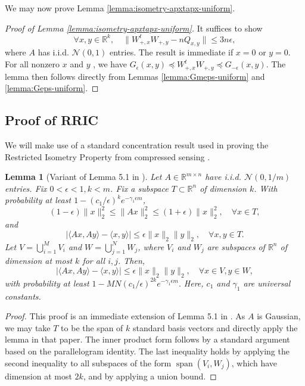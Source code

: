\documentclass[11pt]{article}
\newtheorem{lemma}[theorem]{Lemma}
\newcommand{\R}{\mathbb{R}}
\newcommand{\eps}{\epsilon}
\newcommand{\calN}{\mathcal{N}}
\newcommand{\tran}{t}
\newcommand{\Wplus}[1]{W_{+, #1}}
\newcommand{\Wpx}{\Wplus{x}}
\newcommand{\Wpy}{\Wplus{y}}
\newcommand{\WpxtWpy}{\Wpx^\tran \Wpy}
\newcommand{\Gmeps}{G_{-\eps}}
\newcommand{\Geps}{G_{\eps}}
\newcommand{\matrixleq}{\preceq}
\newcommand{\Qxy}{Q_{x,y}}
\DeclareMathOperator{\Span}{span}
\begin{document}
We may now prove Lemma \ref{lemma:isometry-apxtapx-uniform}.
\begin{proof}[Proof of Lemma \ref{lemma:isometry-apxtapx-uniform}]

It suffices to show
\[
\forall x,y \in \R^k, \quad \|\WpxtWpy -  n\Qxy \| \leq  3 n\eps,
\]
where $A$ has i.i.d. $\mathcal{N}(0,1)$ entries.
The result is immediate if $x=0$ or $y = 0$.
  For all nonzero $x$ and $y$ , we have $\Geps(x,y) \matrixleq \WpxtWpy \matrixleq \Gmeps(x,y)$.  The lemma then follows directly from Lemmas \ref{lemma:Gmeps-uniform} and \ref{lemma:Geps-uniform}.
\end{proof}


\subsection{Proof of RRIC} \label{sec:RRIC-Gaussian}


We will make use of a standard concentration result used in proving the Restricted Isometry Property from compressed sensing \cite{Baraniuk2008}.
\begin{lemma}[Variant of Lemma 5.1 in \cite{Baraniuk2008}] \label{lemma:rip-baraniuk} 
Let $A \in \R^{m \times n}$ have i.i.d. $\calN(0, 1/m)$ entries.  Fix $0< \eps <1, k < m$.  Fix a subspace $T \subset \R^n$ of dimension $k$.  With probability at least $1 - (c_1/\eps)^k e^{-\gamma_1 \eps m}$, 
\[
(1-\eps) \|x\|_2^2 \leq \|Ax\|_2^2 \leq (1+\eps) \|x\|_2^2, \quad \forall x \in T,
\]
and
\[
| \langle Ax, Ay \rangle - \langle x, y \rangle | \leq \eps \|x\|_2 \|y\|_2, \quad \forall x, y \in T.
\]
Let $V = \bigcup_{i=1}^M V_i$ and $W = \bigcup_{j=1}^N W_j$, where $V_i$ and $W_j$ are subspaces of $\R^n$ of dimension at most $k$ for all $i,j$.  Then,
\[
| \langle Ax, Ay \rangle - \langle x, y \rangle| \leq \eps \|x\|_2 \|y\|_2, \quad \forall x \in V, y \in W,
\]
with probability at least $ 1 - MN(c_1/\eps)^{2k} e^{-\gamma_1 \eps m}. $
Here, $c_1$ and $\gamma_1$ are universal constants.
\end{lemma}
\begin{proof}
This proof is an immediate extension of Lemma 5.1 in \cite{Baraniuk2008}.  As $A$ is Gaussian, we may take $T$ to be the span of $k$ standard basis vectors and directly apply the lemma in that paper. The inner product form follows by a standard argument based on the parallelogram identity.  The last inequality holds by applying the second inequality to all subspaces of the form $\Span(V_i, W_j)$, which have dimension at most $2k$, and by applying a union bound.
\end{proof}
\end{document}
